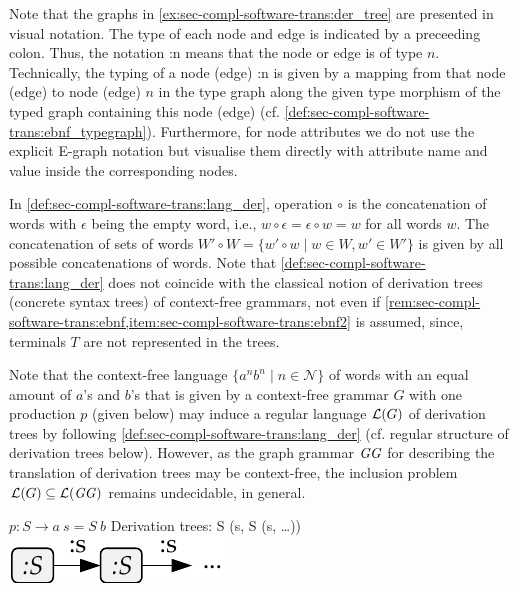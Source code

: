 \begin{remark}
\label{rem:sec-compl-software-trans:vis_graphs}
Note that the graphs in \cref{ex:sec-compl-software-trans:der_tree} are presented in visual notation.
The type of each node and edge is indicated by a preceeding colon.
Thus, the notation \textsf{:n} means that the node or edge is of type $n$.
Technically, the typing of a node (edge) \textsf{:n} is given by a mapping from that node (edge) to node (edge) $n$ in the type graph along the given type morphism of the typed graph containing this node (edge) (cf. \cref{def:sec-compl-software-trans:ebnf_typegraph}).
Furthermore, for node attributes we do not use the explicit E-graph notation but visualise them directly with attribute name and value inside the corresponding nodes.
\envEndMarker
\end{remark}

\begin{remark}
In \cref{def:sec-compl-software-trans:lang_der}, operation $\circ$ is the concatenation of words with $\epsilon$ being the empty word, i.e., $w \circ \epsilon=\epsilon \circ w=w$ for all words $w$.
The concatenation of sets of words $W' \circ W=\{w' \circ w \mid w \in W, w' \in W'\}$ is given by all possible concatenations of words.
Note that \cref{def:sec-compl-software-trans:lang_der} does not coincide with the classical notion of derivation trees (concrete syntax trees) of context-free grammars, not even if \cref{rem:sec-compl-software-trans:ebnf,item:sec-compl-software-trans:ebnf2} is assumed, since, terminals $T$ are not represented in the trees.
\envEndMarker
\end{remark}

\begin{remark}
Note that the context-free language $\{a^nb^n \mid n \in \mathcal{N}\}$ of words with an equal amount of $a$'s and $b$'s that is given by a context-free grammar $G$ with one production $p$ (given below) may induce a regular language $\mathcal{L}(G)$ of derivation trees by following \cref{def:sec-compl-software-trans:lang_der} (cf. regular structure of derivation trees below).
However, as the graph grammar $\mathit{GG}$ for describing the translation of derivation trees may be context-free, the inclusion problem $\mathcal{L}(G) \subseteq \mathcal{L}(\mathit{GG})$ remains undecidable, in general.
\begin{center}
$p\colon S \to a\ s=S\ b$\newline
Derivation trees: \textsf{S (s, S (s, \ldots))}\newline
\includegraphics[width=.2\textwidth]{img/software_trans/ast2.pdf}
\end{center}
\envEndMarker
\end{remark}

